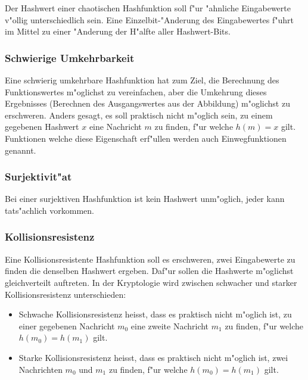 \begin{refsection}
Der Hashwert einer chaotischen Hashfunktion soll f"ur "ahnliche Eingabewerte
v"ollig unterschiedlich sein. Eine Einzelbit-"Anderung des Eingabewertes f"uhrt
im Mittel zu einer "Anderung der H"alfte aller Hashwert-Bits.

\subsubsection{Schwierige Umkehrbarkeit}

Eine schwierig umkehrbare Hashfunktion hat zum Ziel, die Berechnung des
Funktionswertes m"oglichst zu vereinfachen, aber die Umkehrung dieses Ergebnisses
(Berechnen des Ausgangswertes aus der Abbildung) m"oglichst zu erschweren. Anders
gesagt, es soll praktisch nicht m"oglich sein, zu einem gegebenen Hashwert $x$
eine Nachricht $m$ zu finden, f"ur welche $h(m) = x$ gilt.  Funktionen welche
diese Eigenschaft erf"ullen werden auch Einwegfunktionen genannt.

\subsubsection{Surjektivit"at}

Bei einer surjektiven Hashfunktion ist kein Hashwert unm"oglich, jeder kann
tats"achlich vorkommen.

\subsubsection{Kollisionsresistenz}
\label{crypto:kollisionsresistenz}

Eine Kollisionsresistente Hashfunktion soll es erschweren, zwei Eingabewerte zu
finden die denselben Hashwert ergeben. Daf"ur sollen die Hashwerte m"oglichst
gleichverteilt auftreten. In der Kryptologie wird zwischen schwacher und starker
Kollisionsresistenz unterschieden\cite{crypto:stephan2011kryptographie}:

\begin{itemize}
		\item Schwache Kollisionsresistenz heisst, dass es praktisch nicht m"oglich
			ist, zu einer gegebenen Nachricht $m_0$ eine zweite Nachricht $m_1$ zu finden, f"ur
			welche $h(m_0) = h(m_1)$ gilt.
		\item Starke Kollisionsresistenz heisst, dass es praktisch nicht m"oglich
			ist, zwei Nachrichten $m_0$ und $m_1$ zu finden, f"ur welche $h(m_0) =
			h(m_1)$ gilt.
\end{itemize}


\end{refsection}
